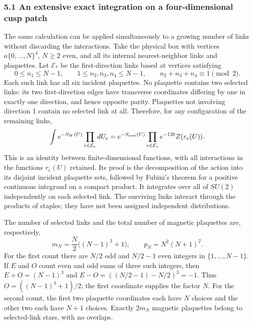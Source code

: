 \documentclass[
  11pt,
]{article}
\begin{document}
\subsubsection{5.1 An extensive exact integration on a four-dimensional
cusp
patch}\label{an-extensive-exact-integration-on-a-four-dimensional-cusp-patch}

The same calculation can be applied simultaneously to a growing number
of links without discarding the interactions. Take the physical box with
vertices \(a\{0,\ldots,N\}^4\), \(N\geq2\) even, and all its internal
nearest-neighbor links and plaquettes. Let \(\mathcal E_*\) be the
first-direction links based at vertices satisfying \[
 0\leq n_1\leq N-1,\qquad 1\leq n_2,n_3,n_4\leq N-1,
 \qquad n_2+n_3+n_4\equiv1\pmod2.
\] Each such link has all six incident plaquettes. No plaquette contains
two selected links: its two first-direction edges have transverse
coordinates differing by one in exactly one direction, and hence
opposite parity. Plaquettes not involving direction 1 contain no
selected link at all. Therefore, for any configuration of the remaining
links, \[
 \int e^{-S_W(U)}\prod_{e\in\mathcal E_*}dU_e
 =e^{-S_{\rm rest}(U)}
   \prod_{e\in\mathcal E_*}e^{-12b}Z(r_e(U)).
\] This is an identity between finite-dimensional functions, with all
interactions in the functions \(r_e(U)\) retained. Its proof is the
decomposition of the action into its disjoint incident plaquette sets,
followed by Fubini's theorem for a positive continuous integrand on a
compact product. It integrates over all of \(SU(2)\) independently on
each selected link. The surviving links interact through the products of
staples; they have not been assigned independent distributions.

The number of selected links and the total number of magnetic plaquettes
are, respectively, \[
 m_N=\frac N2\big((N-1)^3+1\big),\qquad
 p_N=N^2(N+1)^2.
\] For the first count there are \(N/2\) odd and \(N/2-1\) even integers
in \(\{1,\ldots,N-1\}\). If \(E\) and \(O\) count even and odd sums of
three such integers, then \(E+O=(N-1)^3\) and
\(E-O=((N/2-1)-N/2)^3=-1\). Thus \(O=((N-1)^3+1)/2\); the first
coordinate supplies the factor \(N\). For the second count, the first
two plaquette coordinates each have \(N\) choices and the other two each
have \(N+1\) choices. Exactly \(2m_N\) magnetic plaquettes belong to
selected-link stars, with no overlaps.
\end{document}
